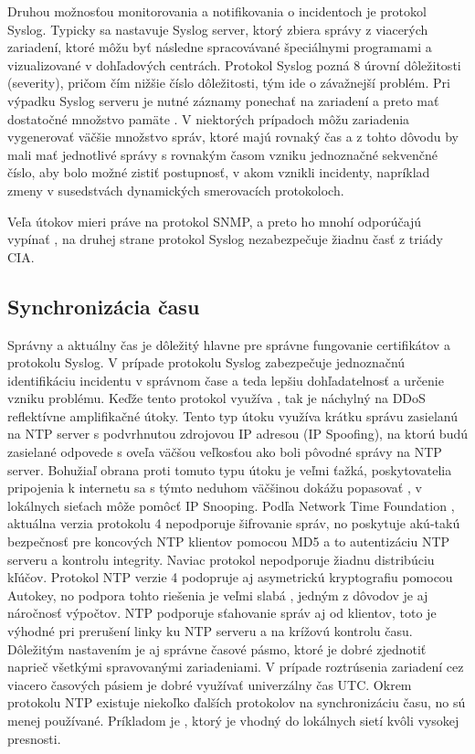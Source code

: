Druhou možnosťou monitorovania a notifikovania o incidentoch je protokol Syslog. Typicky sa nastavuje Syslog server, ktorý zbiera správy z viacerých zariadení, ktoré môžu byť následne spracovávané špeciálnymi programami a vizualizované v dohľadových centrách. Protokol Syslog pozná 8 úrovní dôležitosti (severity), pričom čím nižšie číslo dôležitosti, tým ide o závažnejší problém. Pri výpadku Syslog serveru je nutné záznamy ponechať na zariadení a preto mať dostatočné množstvo pamäte \cite{Singh2018} \cite{uYLsMtQInofenpV3}. V niektorých prípadoch môžu zariadenia vygenerovať väčšie množstvo správ, ktoré majú rovnaký čas a z tohto dôvodu by mali mať jednotlivé správy s rovnakým časom vzniku jednoznačné sekvenčné číslo, aby bolo možné zistiť postupnosť, v akom vznikli incidenty, napríklad zmeny v susedstvách dynamických smerovacích protokoloch.

Veľa útokov mieri práve na protokol SNMP, a preto ho mnohí odporúčajú vypínať \cite{CIS_DrTLsgXv24lxeIIM}, na druhej strane protokol Syslog nezabezpečuje žiadnu časť z triády CIA.   


\subsection*{Synchronizácia času}
Správny a aktuálny čas je dôležitý hlavne pre správne fungovanie certifikátov a protokolu Syslog. V prípade protokolu Syslog zabezpečuje jednoznačnú identifikáciu incidentu v správnom čase a teda lepšiu dohľadatelnosť a určenie vzniku problému. Keďže tento protokol využíva , tak je náchylný na DDoS reflektívne amplifikačné útoky. Tento typ útoku využíva krátku správu zasielanú na NTP server s podvrhnutou zdrojovou IP adresou (IP Spoofing), na ktorú budú zasielané odpovede s oveľa väčšou veľkosťou ako boli pôvodné správy na NTP server. Bohužiaľ obrana proti tomuto typu útoku je veľmi ťažká, poskytovatelia pripojenia k internetu sa s týmto neduhom väčšinou dokážu popasovať \cite{gTkmbyKon9H6tuAm}, v lokálnych sieťach môže pomôcť IP Snooping. Podľa Network Time Foundation \cite{s0goWNnWp5OjqREE}, aktuálna verzia protokolu 4 nepodporuje šifrovanie správ, no poskytuje akú-takú bezpečnosť pre koncových NTP klientov pomocou MD5 a to autentizáciu NTP serveru a kontrolu integrity. Naviac protokol nepodporuje žiadnu distribúciu kľúčov. Protokol NTP verzie 4 podopruje aj asymetrickú kryptografiu pomocou Autokey, no podpora tohto riešenia je veľmi slabá \cite{s0goWNnWp5OjqREE}, jedným z dôvodov je aj náročnosť výpočtov. NTP podporuje sťahovanie správ aj od klientov, toto je výhodné pri prerušení linky ku NTP serveru a na krížovú kontrolu času. Dôležitým nastavením je aj správne časové pásmo, ktoré je dobré zjednotiť naprieč všetkými spravovanými zariadeniami. V prípade roztrúsenia zariadení cez viacero časových pásiem je dobré využívať univerzálny čas UTC. Okrem protokolu NTP existuje niekoľko ďalších protokolov na synchronizáciu času, no sú menej používané. Príkladom je , ktorý je vhodný do lokálnych sietí kvôli vysokej presnosti. 

